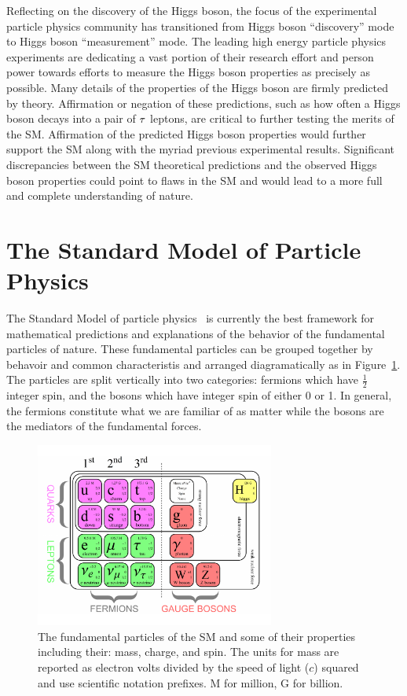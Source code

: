 Reflecting on the discovery of the Higgs boson, the focus of the experimental particle physics community has transitioned from
Higgs boson ``discovery'' mode to Higgs boson ``measurement'' mode. The leading high energy particle physics experiments
are dedicating a vast portion of their research effort and person power towards
efforts to measure the Higgs boson properties as precisely as possible. Many details of the properties of the Higgs
boson are firmly predicted by theory. Affirmation or negation of these predictions,
such as how often a Higgs boson decays into a pair of $\tau$ leptons,
are critical to further testing the merits of the SM. Affirmation of the
predicted Higgs boson properties would further support the SM along with the myriad previous
experimental results. Significant discrepancies between the SM
theoretical predictions and the observed Higgs boson properties could point to
flaws in the SM and would lead to a more full and complete understanding of nature.



\section{The Standard Model of Particle Physics}
The Standard Model of particle physics~\cite{Glashow:1961tr,SM1,SM3} is currently
the best framework for mathematical predictions and explanations of the behavior
of the fundamental particles of nature. These fundamental particles can be grouped
together by behavoir and common characteristis and arranged diagramatically as in
Figure~\ref{fig:sm_particles}. The particles are split vertically into two categories:
fermions which have $\frac{1}{2}$ integer spin, and the bosons which have integer
spin of either 0 or 1. In general, the fermions constitute what we are familiar of
as matter while the bosons are the mediators of the fundamental forces.

\begin{figure}[htbp]
\centering
     \includegraphics[width=0.7\textwidth]{introduction/plots/sm_particles.pdf}
     \caption{
The fundamental particles of the SM and some of their properties including their:
mass, charge, and spin. The units for mass are reported as electron volts divided by
the speed of light ($c$) squared and use scientific notation prefixes.
M for million, G for billion.
     }
     \label{fig:sm_particles}
\end{figure}

